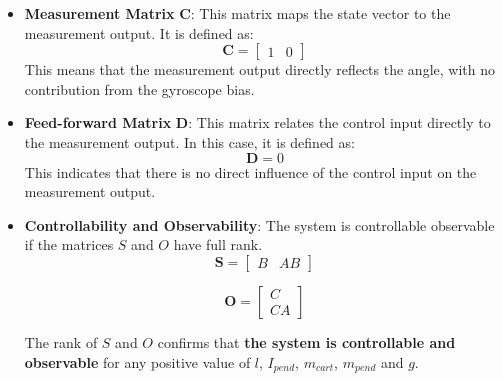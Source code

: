 \begin{itemize}
	\item \textbf{Measurement Matrix} $\mathbf{C}$: This matrix maps the state vector to the measurement output. It is defined as:
\begin{equation}
	\mathbf{C} = \begin{bmatrix} 1 & 0 \end{bmatrix} \label{eq:measurement_matrix}
\end{equation}
	This means that the measurement output directly reflects the angle, with no contribution from the gyroscope bias.
	
	\item \textbf{Feed-forward Matrix} $\mathbf{D}$: This matrix relates the control input directly to the measurement output. In this case, it is defined as:
\begin{equation}
	\mathbf{D} = 0 \label{eq:feedforward_matrix}
\end{equation}
	This indicates that there is no direct influence of the control input on the measurement output.	

	\item \textbf{Controllability and Observability}: The system is controllable observable if the matrices $S$ and $O$ have full rank.
\begin{equation}
	\mathbf{S} =  \begin{bmatrix} B & AB \end{bmatrix} \label{eq:eq}
\end{equation}

\begin{equation}
	\mathbf{O} =  \begin{bmatrix} C \\ CA \end{bmatrix} \label{eq:eq}
\end{equation}

The rank of $S$ and $O$ confirms that \textbf{the system is controllable and observable} for any positive value of $l$, $I_{pend}$, $m_{cart}$, $m_{pend}$ and $g$.
\end{itemize}
